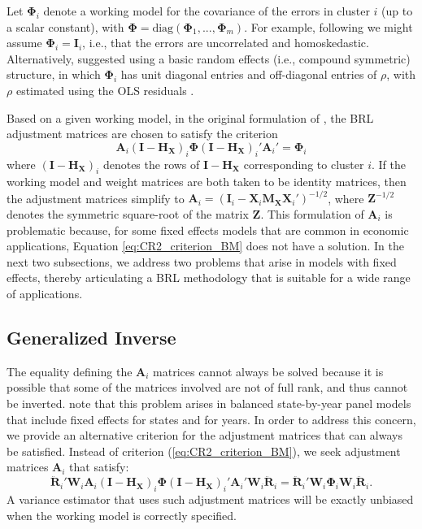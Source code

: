 \documentclass[draft]{ectaart}\usepackage[]{graphicx}\usepackage[]{color}
\newcommand{\bm}{\mathbf}
\newcommand{\bs}{\boldsymbol}
\begin{document}
Let $\bs\Phi_i$ denote a working model for the covariance of the errors in cluster $i$ (up to a scalar constant), with $\bs\Phi = \text{diag}\left(\bs\Phi_1,...,\bs\Phi_m\right)$. 
For example, following \citet{Bell2002bias} we might assume $\bs\Phi_i = \bm{I}_i$, i.e., that the errors are uncorrelated and homoskedastic. 
Alternatively, \citet{Imbens2015robust} suggested using a basic random effects (i.e., compound symmetric) structure, in which $\bs\Phi_i$ has unit diagonal entries and off-diagonal entries of $\rho$, with $\rho$ estimated using the OLS residuals \citep[see][p. 16]{Imbens2015robust}.

Based on a given working model, in the original formulation of \citet{Bell2002bias}, the BRL adjustment matrices are chosen to satisfy the criterion
\begin{equation}
\label{eq:CR2_criterion_BM}
\bm{A}_i \left(\bm{I} - \bm{H_X}\right)_i \bs\Phi \left(\bm{I} - \bm{H_X}\right)_i' \bm{A}_i'  =  \bs\Phi_i 
\end{equation}
where $\left(\bm{I} - \bm{H_X}\right)_i$ denotes the rows of $\bm{I} - \bm{H_X}$ corresponding to cluster $i$.
If the working model and weight matrices are both taken to be identity matrices, then the adjustment matrices simplify to $\bm{A}_i = \left(\bm{I}_i - \bm{X}_i\bm{M_X} \bm{X}_i'\right)^{-1/2}$, where $\bm{Z}^{-1/2}$ denotes the symmetric square-root of the matrix $\bm{Z}$. 
This formulation of $\bm{A}_i$ is problematic because, for some fixed effects models that are common in economic applications, Equation \ref{eq:CR2_criterion_BM} does not have a solution. 
In the next two subsections, we address two problems that arise in models with fixed effects, thereby articulating a BRL methodology that is suitable for a wide range of applications.

\subsection{Generalized Inverse}

The equality defining the $\bm{A}_i$ matrices cannot always be solved because it is possible that some of the matrices involved are not of full rank, and thus cannot be inverted. 
\citet{Angrist2009mostly} note that this problem arises in balanced state-by-year panel models that include fixed effects for states and for years. 
In order to address this concern, we provide an alternative criterion for the adjustment matrices that can always be satisfied. 
Instead of criterion (\ref{eq:CR2_criterion_BM}), we seek adjustment matrices $\bm{A}_i$ that satisfy:
\begin{equation}
\label{eq:CR2_criterion}
\bm{\ddot{R}}_i' \bm{W}_i \bm{A}_i \left(\bm{I} - \bm{H_X}\right)_i \bs\Phi \left(\bm{I} - \bm{H_X}\right)_i' \bm{A}_i' \bm{W}_i \bm{\ddot{R}}_i = \bm{\ddot{R}}_i' \bm{W}_i \bs\Phi_i \bm{W}_i \bm{\ddot{R}}_i.
\end{equation}
A variance estimator that uses such adjustment matrices will be exactly unbiased when the working model is correctly specified.
\end{document}
